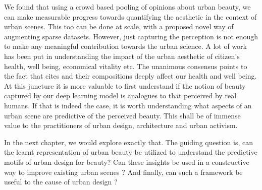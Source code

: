We found that using a crowd based pooling of opinions about urban beauty, we can make measurable progress towards quantifying the aesthetic in the context of urban scenes. This too can be done at scale, with a proposed novel way of augmenting sparse datasets. However, just capturing the perception is not enough to make any meaningful contribution towards the urban science. 
A lot of work has been put in understanding the impact of the urban aesthetic of citizen's health, well being, economical vitality etc. The unanimous consensus points to the fact that cites and their compositions deeply affect our health and well being. 
At this juncture it is more valuable to first understand if the notion of beauty captured by our deep learning model is analogues to that perceived by real humans. If that is indeed the case, it is worth understanding what aspects of an urban scene are predictive of the perceived beauty. This shall be of immense value to the practitioners of urban design, architecture and urban activism.

In the next chapter, we would explore exactly that. The guiding question is, can the learnt representation of urban beauty be utilized to understand the predictive motifs of urban design for beauty? Can these insights be used in a constructive way to improve existing urban scenes ? And finally, can such a framework be useful to the cause of urban design ? 



